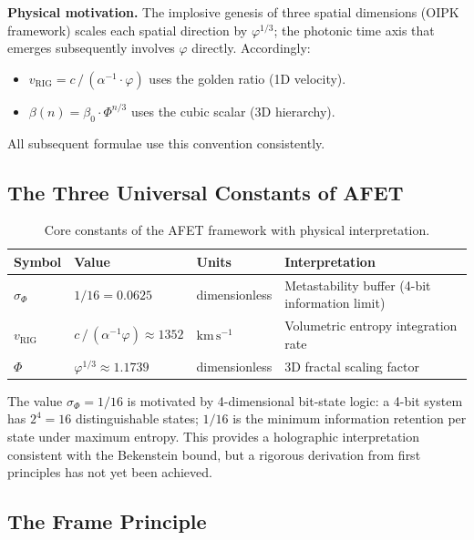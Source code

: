 \documentclass[12pt,a4paper]{article}
\theoremstyle{definition}
\newcommand{\sigphi}{\sigma_{\Phi}}
\newcommand{\vrig}{v_{\mathrm{RIG}}}
\newcommand{\phigold}{\varphi}   %
\newcommand{\PhiAFET}{\Phi}      %
\begin{document}
\textbf{Physical motivation.}
The implosive genesis of three spatial dimensions (OIPK framework) scales each spatial
direction by $\phigold^{1/3}$; the photonic time axis that emerges subsequently
involves $\phigold$ directly.
Accordingly:
\begin{itemize}[leftmargin=1.8em]
  \item $\vrig = c\,/\,(\alpha^{-1}\cdot\phigold)$ uses the golden ratio (1D velocity).
  \item $\beta(n) = \beta_0 \cdot \PhiAFET^{n/3}$ uses the cubic scalar (3D hierarchy).
\end{itemize}
All subsequent formulae use this convention consistently.

\subsection{The Three Universal Constants of AFET}

\begin{table}[h]
\centering
\caption{Core constants of the AFET framework with physical interpretation.}
\label{tab:constants}
\begin{tabular}{llll}
\toprule
\textbf{Symbol} & \textbf{Value} & \textbf{Units} & \textbf{Interpretation} \\
\midrule
$\sigphi$ & $1/16 = 0.0625$ & dimensionless &
  Metastability buffer (4-bit information limit) \\
$\vrig$ & $c\,/\,(\alpha^{-1}\phigold) \approx 1352$ & $\mathrm{km\,s^{-1}}$ &
  Volumetric entropy integration rate \\
$\PhiAFET$ & $\phigold^{1/3} \approx 1.1739$ & dimensionless &
  3D fractal scaling factor \\
\bottomrule
\end{tabular}
\end{table}

\begin{hypothesis}
The value $\sigphi = 1/16$ is motivated by 4-dimensional bit-state logic:
a 4-bit system has $2^4=16$ distinguishable states; $1/16$ is the minimum
information retention per state under maximum entropy.
This provides a holographic interpretation consistent with the Bekenstein bound,
but a rigorous derivation from first principles has not yet been achieved.
\end{hypothesis}

\subsection{The Frame Principle}
\end{document}

